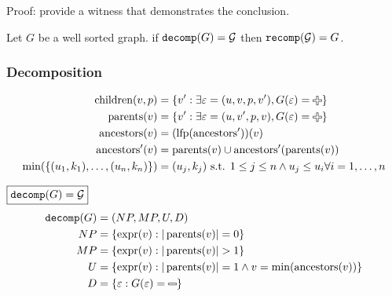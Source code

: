Proof: provide a witness that demonstrates the conclusion.



\begin{theorem}
  Let $G$ be a well sorted graph.
  if $\operatorname{\texttt{decomp}}\mathopen{}\left(G\right)\mathclose{} = \mathcal{G}$ then $\operatorname{\texttt{recomp}}\mathopen{}\left(\mathcal{G}\right)\mathclose{} = G$.
\end{theorem}


\subsubsection{Decomposition}

\begin{align*}
  \children(v, p) &= \SetOf{v' \SuchThat{\exists \e = (u, v, p, v'), G(\e) = \Plus}} \\
  \parents(v) &= \SetOf{v' \SuchThat{\exists \e = (u, v', p, v), G(\e) = \Plus}} \\
  \ancestors(v) &= \mathopen{}\left( \lfp(\ancestors') \right)\mathclose{}(v) \\
  \ancestors'(v) &= \parents(v) \cup \ancestors'(\parents(v)) \\
  \min\mathopen{}\left(\SetOf{(u_1, k_1), \ldots, (u_n, k_n)}\right)\mathclose{} &= (u_j, k_j) \text{ s.t. } 1 \leq j \leq n \land u_j \le u_i \forall i = 1, \ldots, n
\end{align*}

\noindent $\boxed{\operatorname{\texttt{decomp}}\mathopen{}\left(G\right)\mathclose{} = \mathcal{G}}$
%
\begin{align*}
  \decomp{G} &= (NP, MP, U, D) \\
  NP &= \SetOf{\expr(v) \SuchThat{|\parents(v)| = 0}} \\
  MP &= \SetOf{\expr(v) \SuchThat{|\parents(v)| > 1}} \\
  U &= \SetOf{\expr(v) \SuchThat{|\parents(v)| = 1 \land v = \min(\ancestors(v))}} \\
  D &= \SetOf{\e \SuchThat{G(\e) = \Minus}}
\end{align*}

